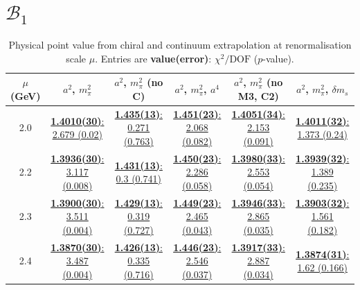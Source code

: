 \documentclass[12pt]{extarticle}
\begin{document}
\section{$\mathcal{B}_1$}
\begin{table}[h!]
\begin{center}
\begin{tabular}{|c|c|c|c|c|c|}
\hline
$\mu$ (GeV) & $a^2$, $m_\pi^2$& $a^2$, $m_\pi^2$ (no C)& $a^2$, $m_\pi^2$, $a^4$& $a^2$, $m_\pi^2$ (no M3, C2)& $a^2$, $m_\pi^2$, $\delta m_s$\\
\hline
2.0& \hyperlink{VVpAA/NPR/bag_a2m2_20.pdf.1}{\textbf{1.4010(30)}: 2.679 (0.02)} & \hyperlink{VVpAA/NPR/bag_a2m2noC_20.pdf.1}{\textbf{1.435(13)}: 0.271 (0.763)} & \hyperlink{VVpAA/NPR/bag_a2a4m2_20.pdf.1}{\textbf{1.451(23)}: 2.068 (0.082)} & \hyperlink{VVpAA/NPR/bag_a2m2mcut_20.pdf.1}{\textbf{1.4051(34)}: 2.153 (0.091)} & \hyperlink{VVpAA/NPR/bag_a2m2delm_20.pdf.1}{\textbf{1.4011(32)}: 1.373 (0.24)}\\
2.2& \hyperlink{VVpAA/NPR/bag_a2m2_22.pdf.1}{\textbf{1.3936(30)}: 3.117 (0.008)} & \hyperlink{VVpAA/NPR/bag_a2m2noC_22.pdf.1}{\textbf{1.431(13)}: 0.3 (0.741)} & \hyperlink{VVpAA/NPR/bag_a2a4m2_22.pdf.1}{\textbf{1.450(23)}: 2.286 (0.058)} & \hyperlink{VVpAA/NPR/bag_a2m2mcut_22.pdf.1}{\textbf{1.3980(33)}: 2.553 (0.054)} & \hyperlink{VVpAA/NPR/bag_a2m2delm_22.pdf.1}{\textbf{1.3939(32)}: 1.389 (0.235)}\\
2.3& \hyperlink{VVpAA/NPR/bag_a2m2_23.pdf.1}{\textbf{1.3900(30)}: 3.511 (0.004)} & \hyperlink{VVpAA/NPR/bag_a2m2noC_23.pdf.1}{\textbf{1.429(13)}: 0.319 (0.727)} & \hyperlink{VVpAA/NPR/bag_a2a4m2_23.pdf.1}{\textbf{1.449(23)}: 2.465 (0.043)} & \hyperlink{VVpAA/NPR/bag_a2m2mcut_23.pdf.1}{\textbf{1.3946(33)}: 2.865 (0.035)} & \hyperlink{VVpAA/NPR/bag_a2m2delm_23.pdf.1}{\textbf{1.3903(32)}: 1.561 (0.182)}\\
2.4& \hyperlink{VVpAA/NPR/bag_a2m2_24.pdf.1}{\textbf{1.3870(30)}: 3.487 (0.004)} & \hyperlink{VVpAA/NPR/bag_a2m2noC_24.pdf.1}{\textbf{1.426(13)}: 0.335 (0.716)} & \hyperlink{VVpAA/NPR/bag_a2a4m2_24.pdf.1}{\textbf{1.446(23)}: 2.546 (0.037)} & \hyperlink{VVpAA/NPR/bag_a2m2mcut_24.pdf.1}{\textbf{1.3917(33)}: 2.887 (0.034)} & \hyperlink{VVpAA/NPR/bag_a2m2delm_24.pdf.1}{\textbf{1.3874(31)}: 1.62 (0.166)}\\
\hline
\end{tabular}
\caption{Physical point value from chiral and continuum extrapolation at renormalisation scale $\mu$. Entries are \textbf{value(error)}: $\chi^2/\text{DOF}$ ($p$-value).}
\end{center}
\end{table}
\end{document}
